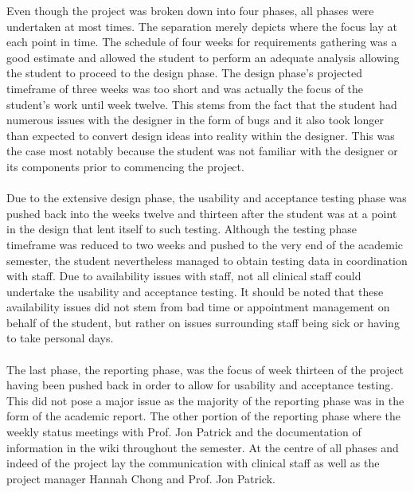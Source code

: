 Even though the project was broken down into four phases, all phases were undertaken at most times. The separation merely depicts where the focus lay at each point in time. The schedule of four weeks for requirements gathering was a good estimate and allowed the student to perform an adequate analysis allowing the student to proceed to the design phase. The design phase's projected timeframe of three weeks was too short and was actually the focus of the student's work until week twelve. This stems from the fact that the student had numerous issues with the designer in the form of bugs and it also took longer than expected to convert design ideas into reality within the designer. This was the case most notably because the student was not familiar with the designer or its components prior to commencing the project.
\\ \\
Due to the extensive design phase, the usability and acceptance testing phase was pushed back into the weeks twelve and thirteen after the student was at a point in the design that lent itself to such testing. Although the testing phase timeframe was reduced to two weeks and pushed to the very end of the academic semester, the student nevertheless managed to obtain testing data in coordination with staff. Due to availability issues with staff, not all clinical staff could undertake the usability and acceptance testing. It should be noted that these availability issues did not stem from bad time or appointment management on behalf of the student, but rather on issues surrounding staff being sick or having to take personal days. 
\\ \\
The last phase, the reporting phase, was the focus of week thirteen of the project having been pushed back in order to allow for usability and acceptance testing. This did not pose a major issue as the majority of the reporting phase was in the form of the academic report. The other portion of the reporting phase where the weekly status meetings with Prof. Jon Patrick and the documentation of information in the wiki throughout the semester. At the centre of all phases and indeed of the project lay the communication with clinical staff as well as the project manager Hannah Chong and Prof. Jon Patrick.
